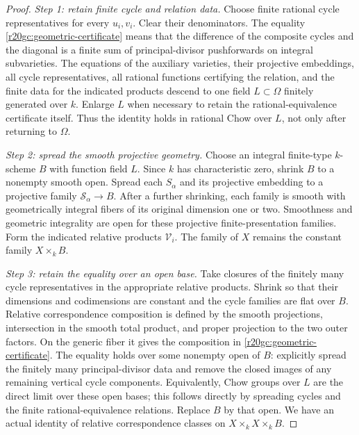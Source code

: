 \begin{proof}
\emph{Step 1: retain finite cycle and relation data.}
Choose finite rational cycle representatives for every $u_i,v_i$.
Clear their denominators.  The equality
\eqref{r20gc:geometric-certificate} means that the difference
of the composite cycles and the diagonal is a finite sum of
principal-divisor pushforwards on integral subvarieties.
The equations of the auxiliary varieties, their projective
embeddings, all cycle representatives, all rational functions
certifying the relation, and the finite data for the indicated
products descend to one field $L\subset\Omega$ finitely
generated over $k$.  Enlarge $L$ when necessary to retain
the rational-equivalence certificate itself.  Thus the identity
holds in rational Chow over $L$, not only after returning to
$\Omega$.

\emph{Step 2: spread the smooth projective geometry.}
Choose an integral finite-type $k$-scheme $B$ with function
field $L$.  Since $k$ has characteristic zero, shrink $B$ to
a nonempty smooth open.  Spread each $S_\alpha$ and its
projective embedding to a projective family
$\mathcal S_\alpha\to B$.  After a further shrinking, each
family is smooth with geometrically integral fibers of its
original dimension one or two.  Smoothness and geometric
integrality are open for these projective finite-presentation
families.  Form the indicated relative products $\mathcal V_i$.
The family of $X$ remains the constant family $X\times_k B$.

\emph{Step 3: retain the equality over an open base.}
Take closures of the finitely many cycle representatives in
the appropriate relative products.  Shrink so that their
dimensions and codimensions are constant and the cycle families
are flat over $B$.  Relative correspondence composition is
defined by the smooth projections, intersection in the smooth
total product, and proper projection to the two outer factors.
On the generic fiber it gives the composition in
\eqref{r20gc:geometric-certificate}.  The equality holds over
some nonempty open of $B$: explicitly spread the finitely many
principal-divisor data and remove the closed images of any
remaining vertical cycle components.  Equivalently, Chow
groups over $L$ are the direct limit over these open bases;
this follows directly by spreading cycles and the finite
rational-equivalence relations.  Replace $B$ by that open.
We have an actual identity of relative correspondence classes
on $X\times_k X\times_k B$.


\end{proof}
